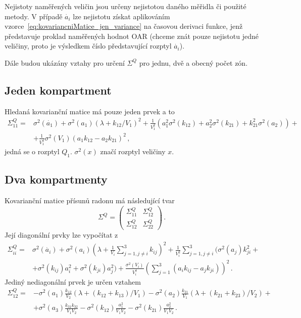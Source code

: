 Nejistoty naměřených veličin jsou určeny nejistotou daného měřidla či použité metody. V případě $\dot{a_i}$ lze nejistotu získat aplikováním vzorce~\eqref{eq:kovariancniMatice_jen_variance} na časovou derivaci funkce, jenž představuje proklad naměřených hodnot OAR (chceme znát pouze nejistotu jedné veličiny, proto je výsledkem číslo představující rozptyl $\dot{a_i}$).

Dále budou ukázány vztahy pro určení $\Sigma^Q$ pro jednu, dvě a obecný počet zón.
\subsection{Jeden kompartment}
Hledaná kovarianční matice má pouze jeden prvek a to
\begin{align}
    \Sigma_{11}^Q=&\sigma^2(\dot{a_1}) + \sigma^2(a_1)(\lambda + k_{12}/V_1)^2 + \frac{1}{V_1^2}\left(a_1^2\sigma^2(k_{12}) + a_2^2\sigma^2(k_{21}) + k_{21}^2\sigma^2(a_2)\right) +\nonumber\\
    &+\frac{1}{V_1^4}\sigma^2(V_1)(a_1 k_{12} - a_2k_{21})^2\,,
    \label{eq:nejistota_jednaZona}
\end{align}
jedná se o rozptyl $Q_1$. $\sigma^2(x)$ značí rozptyl veličiny $x$.
\subsection{Dva kompartmenty}
Kovarianční matice přísunů radonu má následující tvar
\begin{equation}
    \Sigma^Q=\begin{pmatrix}
        \Sigma^Q_{11}&\Sigma^Q_{12}\\
        \Sigma^Q_{12}&\Sigma^Q_{22}
    \end{pmatrix}\,.
\end{equation}
Její diagonální prvky lze vypočítat z
\begin{align}
    \Sigma_{ii}^Q=&\sigma^2(\dot{a_i}) + \sigma^2(a_i)\left(\lambda + \frac{1}{V_i}\sum_{j=1,j\neq i}^{3}k_{ij}\right)^2 + \frac{1}{V_i^2}\sum_{j=1,j\neq i}^{3}\big(\sigma^2(a_j)k_{ji}^2 + \nonumber\\
    &+ \sigma^2(k_{ij})a_i^2 + \sigma^2(k_{ji})a_j^2\big) + \frac{\sigma^2(V_i)}{V_i^4}\left(\sum_{j=1}^{3}\left(a_i k_{ij} -a_j k_{ji}\right)\right)^2\,.
    \label{eq:nejistota_dveZony}
\end{align}
Jediný nediagonální prvek je určen vztahem
\begin{align}
    \Sigma_{12}^Q=&-\sigma^2(a_1)\frac{k_{12}}{V_2}(\lambda + (k_{12} + k_{13})/V_1) - \sigma^2(a_2)\frac{k_{21}}{V_1}(\lambda + (k_{21} + k_{23})/V_2)+\nonumber\\
    &+ \sigma^2(a_3)\frac{k_{31}k_{32}}{V_1V_2} - \sigma^2(k_{12})\frac{a_1^2}{V_1V_2} - \sigma^2(k_{21})\frac{a_2^2}{V_1V_2}\,.
\end{align}
